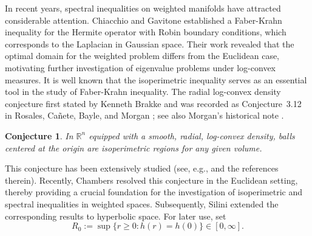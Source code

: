 \documentclass[11pt,leqno]{amsart}
\newtheorem{conjecture}[theorem]{Conjecture}
\numberwithin{equation}{section}
\begin{document}

In recent years, spectral inequalities on weighted manifolds have attracted considerable attention. Chiacchio and Gavitone \cite{Chiacchiomathann} established a Faber-Krahn inequality for the Hermite operator with Robin boundary conditions, which corresponds to the Laplacian in Gaussian space. Their work revealed that the optimal domain for the weighted problem differs from the Euclidean case, motivating further investigation of eigenvalue problems under log-convex measures. 
It is well known that the isoperimetric inequality serves as an essential tool in the study of  Faber-Krahn  inequality. The radial log-convex density conjecture first stated by
Kenneth Brakke and was recorded as Conjecture~3.12 in Rosales, Ca\~nete,
Bayle, and Morgan \cite{Morgan}; see also Morgan's historical note
\cite{MorganBlog2010}.

\begin{conjecture}\label{conj1}
In $\mathbb{R}^{n}$  equipped with a smooth, radial, log-convex density, balls centered at the origin are isoperimetric regions for any given volume.
\end{conjecture}
This conjecture has been extensively studied (see, e.g., \cite{Figalli13, Morgan}  and the references therein). Recently, Chambers \cite{ChamberJEMS}  resolved this  conjecture in the Euclidean setting, thereby providing a crucial foundation for the investigation of isoperimetric and spectral inequalities in weighted spaces. Subsequently, Silini \cite{Silini24}  extended the corresponding results to hyperbolic space. 
 For later use, set
\begin{equation}\label{eq:flat-core-radius}
	R_0:=\sup\{r\geq0:h(r)=h(0)\}\in[0,\infty].
\end{equation}
\end{document}
